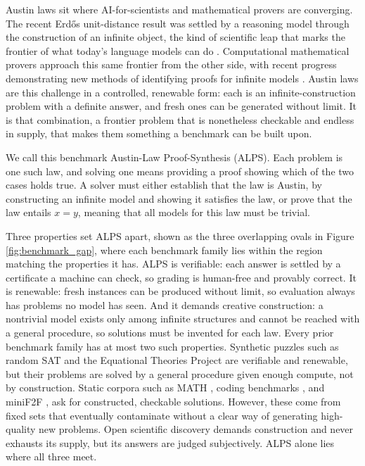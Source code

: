 \documentclass[letterpaper]{article} %
\begin{document}
Austin laws sit where AI-for-scientists and mathematical provers are converging. The recent Erdős unit-distance result was settled by a reasoning model through the construction of an infinite object, the kind of scientific leap that marks the frontier of what today's language models can do \citep{openai2026unitdistance}. Computational mathematical provers approach this same frontier from the other side, with recent progress demonstrating new methods of identifying proofs for infinite models \citep{janota2026case}. Austin laws are this challenge in a controlled, renewable form: each is an infinite-construction problem with a definite answer, and fresh ones can be generated without limit. It is that combination, a frontier problem that is nonetheless checkable and endless in supply, that makes them something a benchmark can be built upon. 

We call this benchmark Austin-Law Proof-Synthesis (ALPS). Each problem is one such law, and solving one means providing a proof showing which of the two cases holds true. A solver must either establish that the law is Austin, by constructing an infinite model and showing it satisfies the law, or prove that the law entails $x = y$, meaning that all models for this law must be trivial. 

Three properties set ALPS apart, shown as the three overlapping ovals in Figure \ref{fig:benchmark_gap}, where each benchmark family lies within the region matching the properties it has. ALPS is verifiable: each answer is settled by a certificate a machine can check, so grading is human-free and provably correct. It is renewable: fresh instances can be produced without limit, so evaluation always has problems no model has seen. And it demands creative construction: a nontrivial model exists only among infinite structures and cannot be reached with a general procedure, so solutions must be invented for each law. Every prior benchmark family has at most two such properties. Synthetic puzzles such as random SAT \citep{selman1996generating} and the Equational Theories Project \citep{bolan2025equational} are verifiable and renewable, but their problems are solved by a general procedure given enough compute, not by construction. Static corpora such as MATH \citep{hendrycks2021measuring}, coding benchmarks \citep{chen2021evaluating}, and miniF2F \citep{zheng2021minif2f}, ask for constructed, checkable solutions. However, these come from fixed sets that eventually contaminate without a clear way of generating high-quality new problems. Open scientific discovery \citep{lu2024ai, gottweis2026accelerating} demands construction and never exhausts its supply, but its answers are judged subjectively. ALPS alone lies where all three meet. 
\end{document}
